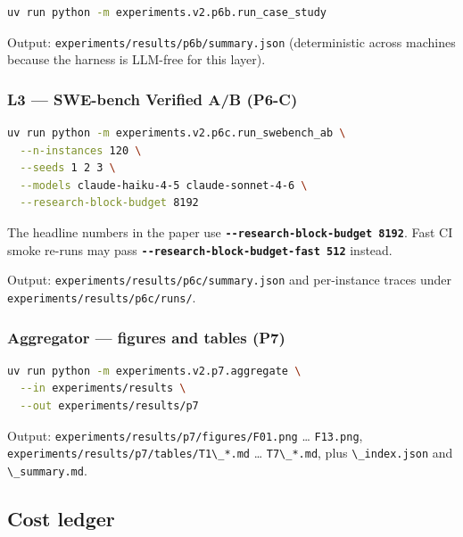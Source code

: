 \begin{lstlisting}[language=bash]
uv run python -m experiments.v2.p6b.run_case_study
\end{lstlisting}

Output: \passthrough{\lstinline!experiments/results/p6b/summary.json!} (deterministic across machines because the harness is LLM-free for this layer).

\subsubsection{L3 --- SWE-bench Verified A/B (P6-C)}\label{l3-swe-bench-verified-ab-p6-c}

\begin{lstlisting}[language=bash]
uv run python -m experiments.v2.p6c.run_swebench_ab \
  --n-instances 120 \
  --seeds 1 2 3 \
  --models claude-haiku-4-5 claude-sonnet-4-6 \
  --research-block-budget 8192
\end{lstlisting}

The headline numbers in the paper use \textbf{\passthrough{\lstinline!--research-block-budget 8192!}}. Fast CI smoke re-runs may pass \textbf{\passthrough{\lstinline!--research-block-budget-fast 512!}} instead.

Output: \passthrough{\lstinline!experiments/results/p6c/summary.json!} and per-instance traces under \passthrough{\lstinline!experiments/results/p6c/runs/!}.

\subsubsection{Aggregator --- figures and tables (P7)}\label{aggregator-figures-and-tables-p7}

\begin{lstlisting}[language=bash]
uv run python -m experiments.v2.p7.aggregate \
  --in experiments/results \
  --out experiments/results/p7
\end{lstlisting}

Output: \passthrough{\lstinline!experiments/results/p7/figures/F01.png!} \ldots{} \passthrough{\lstinline!F13.png!}, \passthrough{\lstinline!experiments/results/p7/tables/T1\_*.md!} \ldots{} \passthrough{\lstinline!T7\_*.md!}, plus \passthrough{\lstinline!\_index.json!} and \passthrough{\lstinline!\_summary.md!}.

\subsection{Cost ledger}\label{cost-ledger}

